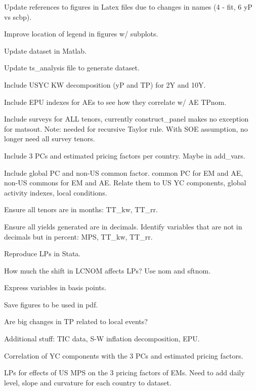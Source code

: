 \documentclass[12pt]{article}
\newcommand{\cmark}{\ding{51}}
\newcommand{\xmark}{\ding{55}}
\newcommand{\done}{\rlap{$\square$}{\raisebox{2pt}{\large\hspace{1pt}\cmark}}%
	\hspace{-2.5pt}}
\newcommand{\wontdo}{\rlap{$\square$}{\large\hspace{1pt}\xmark}}
\begin{document}
\begin{todolist}
\begin{todolist}
		\item Update references to figures in Latex files due to changes in names (4 - fit, 6 yP vs scbp).
		\item Improve location of legend in figures w/ subplots.
	\end{todolist}
	\item Update dataset in Matlab.
	\begin{todolist}
		\item[\done] Update ts_analysis file to generate dataset.
		\item[\done] Include USYC KW decomposition (yP and TP) for 2Y and 10Y.
		\item[\done] Include EPU indexes for AEs to see how they correlate w/ AE TPnom.
		\item[\wontdo] Include surveys for ALL tenors, currently construct_panel makes no exception for matsout. Note: needed for recursive Taylor rule. With SOE assumption, no longer need all survey tenors.
		\item Include 3 PCs and estimated pricing factors per country. Maybe in add_vars.
		\item Include global PC and non-US common factor. common PC for EM and AE, non-US commons for EM and AE. Relate them to US YC components, global activity indexes, local conditions.
		\item Ensure all tenors are in months: TT_kw, TT_rr.
		\item Ensure all yields generated are in decimals. Identify variables that are not in decimals but in percent: MPS, TT_kw, TT_rr.
	\end{todolist}
	\item Reproduce LPs in Stata.
	\begin{todolist}
		\item How much the shift in LCNOM affects LPs? Use nom and sftnom.
		\item Express variables in basis points.
		\item Save figures to be used in pdf.
		\item Are big changes in TP related to local events?
	\end{todolist}
	\item Additional stuff: TIC data, S-W inflation decomposition, EPU.
	\begin{todolist}
		\item Correlation of YC components with the 3 PCs and estimated pricing factors.
		\item LPs for effects of US MPS on the 3 pricing factors of EMs. Need to add daily level, slope and curvature for each country to dataset.

\end{todolist}
\end{todolist}
\end{document}
